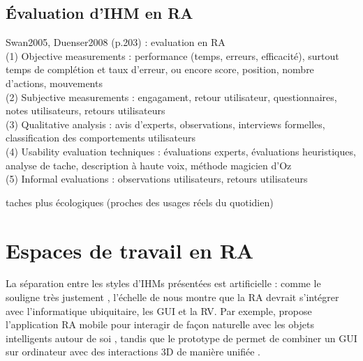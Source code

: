 \subsection{Évaluation d'IHM en RA}
Swan2005, Duenser2008 (p.203) : evaluation en RA\\
(1) Objective measurements : performance (temps, erreurs, efficacité), surtout temps de complétion et taux d'erreur, ou encore score, position, nombre d'actions, mouvements\\
(2) Subjective measurements : engagament, retour utilisateur, questionnaires, notes utilisateurs, retours utilisateurs\\
(3) Qualitative analysis : avis d'experts, observations, interviews formelles, classification des comportements utilisateurs\\
(4) Usability evaluation techniques : évaluations experts, évaluations heuristiques, analyse de tache, description à haute voix, méthode magicien d'Oz\\
(5) Informal evaluations : observations utilisateurs, retours utilisateurs

taches plus écologiques (proches des usages réels du quotidien)


\section{Espaces de travail en RA}
La séparation entre les styles d'IHMs présentées \cite{Rekimoto1995}  est artificielle : comme le souligne très justement \cite{Billinghurst2015}, l'échelle de \cite{Milgram1994} nous montre que la RA devrait s'intégrer avec l'informatique ubiquitaire, les GUI et la RV. Par exemple, \cite{Heun2016} propose l'application RA mobile  pour interagir de façon naturelle avec les objets intelligents autour de soi , tandis que le prototype  de \cite{Lee2013} permet de combiner un GUI sur ordinateur avec des interactions 3D de manière unifiée .


